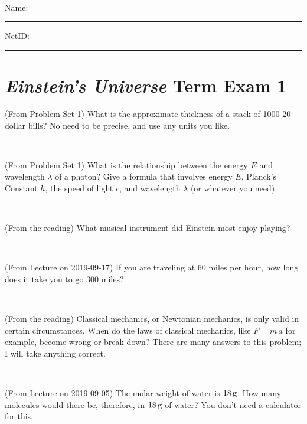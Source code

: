 \documentclass[12pt, letterpaper]{article}
\begin{document}
\vfill ~


\cleardoublepage



\noindent
Name: \rule[-1ex]{0.60\textwidth}{0.1pt}
NetID: \rule[-1ex]{0.20\textwidth}{0.1pt}

\section*{\textsl{Einstein's Universe} Term Exam 1}
\setcounter{problem}{1}


\begin{problem} (From Problem Set 1)
What is the approximate thickness of a stack of 1000 20-dollar bills?
No need to be precise, and use any units you like.
\end{problem}


\vfill ~

\begin{problem} (From Problem Set 1)
What is the relationship between the energy $E$ and wavelength
$\lambda$ of a photon? Give a formula that involves energy $E$,
Planck's Constant $h$, the speed of light $c$, and wavelength
$\lambda$ (or whatever you need).
\end{problem}

\vfill ~

\begin{problem} (From the reading)
What musical instrument did Einstein most enjoy playing?
\end{problem}


\vfill ~

\begin{problem} (From Lecture on 2019-09-17)
If you are traveling at 60 miles per hour, how long does
it take you to go 300 miles?
\end{problem}


\vfill ~


\clearpage


\begin{problem} (From the reading)
Classical mechanics, or Newtonian mechanics, is only valid in certain
circumstances. When do the laws of classical mechanics, like $F =
m\,a$ for example, become wrong or break down? There are many answers
to this problem; I will take anything correct.
\end{problem}


\vfill ~

\begin{problem} (From Lecture on 2019-09-05)
The molar weight of water is $18\,\mathrm{g}$. How many molecules would there
be, therefore, in $18\,\mathrm{g}$ of water? You don't need a calculator for
this.
\end{problem}
\end{document}
